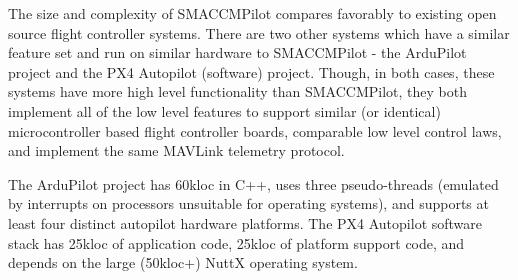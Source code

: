 The size and complexity of SMACCMPilot compares favorably to existing open
source flight controller systems. There are two other systems which have a
similar feature set and run on similar hardware to SMACCMPilot - the ArduPilot
project and the PX4 Autopilot (software) project. Though, in both cases, these
systems have more high level functionality than SMACCMPilot, they both implement
all of the low level features to support similar (or identical) microcontroller
based flight controller boards, comparable low level control laws, and implement
the same MAVLink telemetry protocol.

The ArduPilot project has 60kloc in C++, uses three pseudo-threads (emulated by
interrupts on processors unsuitable for operating systems), and supports at
least four distinct autopilot hardware platforms. The PX4 Autopilot software
stack has 25kloc of application code, 25kloc of platform support code, and
depends on the large (50kloc+) NuttX operating system.

